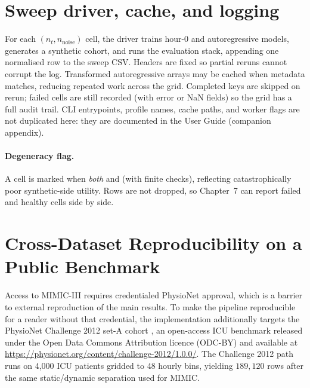 \section{Sweep driver, cache, and logging}
\label{sec:unified-sweep}

For each $(n_t, n_{\text{noise}})$ cell, the driver trains hour-0 and autoregressive models, generates a synthetic cohort, and runs the evaluation stack, appending one normalised row to the sweep CSV. Headers are fixed so partial reruns cannot corrupt the log. Transformed autoregressive arrays may be cached when metadata matches, reducing repeated work across the grid. Completed keys are skipped on rerun; failed cells are still recorded (with error or NaN fields) so the grid has a full audit trail. CLI entrypoints, profile names, cache paths, and worker flags are not duplicated here: they are documented in the User Guide (companion appendix).

\paragraph{Degeneracy flag.}
A cell is marked  when \emph{both}  and  (with finite checks), reflecting catastrophically poor synthetic-side utility. Rows are not dropped, so Chapter~7 can report failed and healthy cells side by side.

\section{Cross-Dataset Reproducibility on a Public Benchmark}
\label{sec:challenge2012-impl}

Access to MIMIC-III requires credentialed PhysioNet approval, which is a barrier to external reproduction of the main results. To make the pipeline reproducible for a reader without that credential, the implementation additionally targets the PhysioNet Challenge 2012 set-A cohort \cite{silva2012challenge}, an open-access ICU benchmark released under the Open Data Commons Attribution licence (ODC-BY) and available at \url{https://physionet.org/content/challenge-2012/1.0.0/}. The Challenge 2012 path runs on 4{,}000 ICU patients gridded to 48 hourly bins, yielding $189{,}120$ rows after the same static/dynamic separation used for MIMIC.

